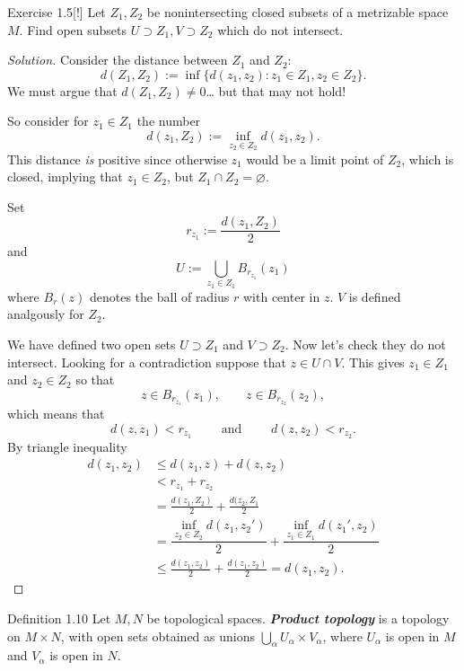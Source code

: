 \begin{thing4}{Exercise 1.5}[!]\label{exer:1.5}\leavevmode
	Let $Z_1,Z_2$ be nonintersecting closed subsets of a metrizable space $M$. Find open subsets $U \supset Z_1, V \supset Z_2$ which do not intersect.
\end{thing4}

\begin{proof}[Solution]\leavevmode
{\color{2}Consider the distance between $Z_1$ and $Z_2$:
\[d(Z_1,Z_2):=\operatorname{inf}\{d(z_1,z_2):z_1 \in Z_1, z_2 \in Z_2\}.\]
We must argue that $d(Z_1,Z_2) \neq 0$… but that may not hold!}

So consider for \(z_1\in Z_1\) the number
\[d(z_1,Z_2):=\operatorname{inf}_{z_2\in Z_2}d(z_1,z_2).\]
This distance \textit{is} positive since otherwise \(z_1\) would be a limit point of \(Z_2\), which is closed, implying that \(z_1 \in Z_2\), but \(Z_1 \cap Z_2=\varnothing\).

Set
\[r_{z_1}:=\frac{d(z_1,Z_2)}{2}\]
and
\[U:=\bigcup_{z_1 \in Z_1} B_{r_{z_1}}(z_1)\]
where \(B_r(z)\) denotes the ball of radius  \(r\) with center in  \(z\).  \(V\) is defined analgously for  \(Z_2\).

We have defined two open sets \(U \supset Z_1\) and \(V \supset Z_2\). Now let's check they do not intersect. Looking for a contradiction suppose that \(z \in U \cap V\). This gives \(z_1 \in Z_1\) and \(z_2 \in Z_2\) so that
\[z \in B_{r_{z_1}}(z_1),\qquad z \in B_{r_{z_2}}(z_2),\]
which means that
\[d(z,z_1)<r_{z_1}\qquad \text{ and } \qquad d(z,z_2)<r_{z_2}.\]
By triangle inequality
\begin{align*}
d(z_1,z_2)&\leq d(z_1,z)+d(z,z_2)\\
&<r_{z_1}+r_{z_2}\\
&=\frac{d(z_1,Z_2)}{2}+\frac{d(z_2,Z_1}{2}\\
&=\dfrac{\operatorname{inf}_{z_2 \in Z_2}d(z_1,z_2')}{2}+\dfrac{\operatorname{inf}_{z_1 \in Z_1}d(z_1',z_2)}{2}\\
&\leq \frac{d(z_1,z_2)}{2}+\frac{d(z_1,z_2)}{2}=d(z_1,z_2).
\end{align*}
\end{proof}

\begin{thing3}{Definition 1.10}\leavevmode
	Let $M,N$ be topological spaces. \textit{\textbf{Product topology}} is a topology on $M \times N$, with open sets obtained as unions $\bigcup_{\alpha} U_\alpha \times V_\alpha$, where $U_\alpha$ is open in $M$ and $V_\alpha$ is open in $N$.
\end{thing3}

